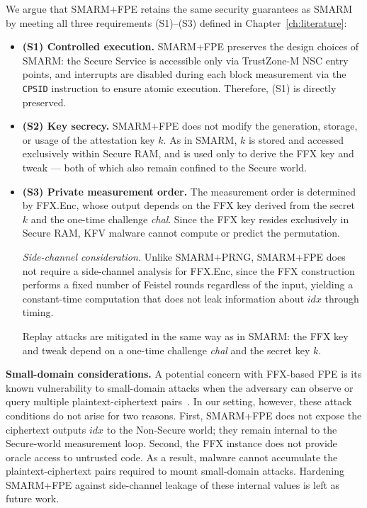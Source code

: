 \documentclass[a4paper,10pt]{article}
\begin{document}
{We argue that SMARM+FPE retains the same security guarantees 
as SMARM by meeting all three requirements (S1)--(S3) defined 
in Chapter~\ref{ch:literature}:

\begin{itemize}
    \item \textbf{(S1) Controlled execution.} 
    SMARM+FPE preserves the design choices of 
    SMARM: the Secure Service is accessible only via TrustZone-M 
    NSC entry points, and interrupts are disabled during each 
    block measurement via the \texttt{CPSID} instruction to 
    ensure atomic execution. Therefore, (S1) is directly preserved.
    
    \item \textbf{(S2) Key secrecy.} 
    SMARM+FPE does not modify the generation, 
    storage, or usage of the attestation key $k$. As in SMARM, 
    $k$ is stored and accessed exclusively within Secure RAM, 
    and is used only to derive the FFX key and tweak — both of 
    which also remain confined to the Secure world.
    
    \item \textbf{(S3) Private measurement order.} The 
    measurement order is determined by \textsf{FFX.Enc}, whose 
    output depends on the FFX key derived from the secret $k$ 
    and the one-time challenge \textit{chal}. Since the FFX key 
    resides exclusively in Secure RAM, KFV malware cannot 
    compute or predict the permutation. 

     \emph{Side-channel consideration.} Unlike SMARM+PRNG, 
    SMARM+FPE does not require a side-channel analysis for 
    \textsf{FFX.Enc}, since the FFX construction performs a 
    fixed number of Feistel rounds regardless of the input, 
    yielding a constant-time computation that does not leak 
    information about $\mathit{idx}$ through timing.
    
    Replay attacks are mitigated in the same way as in SMARM: 
    the FFX key and tweak depend on a one-time challenge 
    \textit{chal} and the secret key $k$.
    
\end{itemize}

\textbf{Small-domain considerations.} A potential concern with 
FFX-based FPE is its known vulnerability to small-domain attacks 
when the adversary can observe or query multiple 
plaintext-ciphertext pairs~\cite{hoang2018curse}. In our setting, 
however, these attack conditions do not arise for two reasons. 
First, SMARM+FPE does not expose the ciphertext 
outputs $\mathit{idx}$ to the Non-Secure world; they remain 
internal to the Secure-world measurement loop. Second, the FFX 
instance does not provide oracle access to untrusted code. As a 
result, malware cannot accumulate the plaintext-ciphertext pairs 
required to mount small-domain attacks. Hardening SMARM+FPE against side-channel leakage of these 
internal values is left as future work.

}
\end{document}
